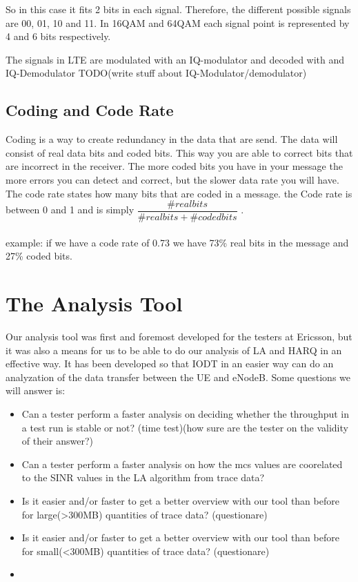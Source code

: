 \documentclass[cropmarks, frame, english]{idamasterthesis}
\begin{document}
 So in this case it fits 2 bits in each signal. Therefore, the different possible signals are 00, 01, 10 and 11. In 16QAM and 64QAM each signal point is represented by 4 and 6 bits respectively.

The signals in LTE are modulated with an IQ-modulator and decoded with and IQ-Demodulator 
TODO(write stuff about IQ-Modulator/demodulator)

\section{Coding and Code Rate}
Coding is a way to create redundancy in the data that are send. The data will consist of real data bits and coded bits. This way you are able to correct bits that are incorrect in the receiver. The more coded bits you have in your message the more errors you can detect and correct, but the slower data rate you will have. The code rate states how many bits that are coded in a message. the Code rate is between 0 and 1 and is simply $\dfrac{\# real bits}{ \# real bits + \# coded bits}$ . 
\\ \\
example: if we have a code rate of 0.73 we have 73\% real bits in the message and 27\% coded bits. 



\chapter{The Analysis Tool}
Our analysis tool was first and foremost developed for the testers at Ericsson, but it was also a means for us to be able to do our analysis of LA and HARQ in an effective way. It has been developed so that IODT in an easier way can do an analyzation of the data transfer between the UE and eNodeB. Some questions we will answer is:
\begin{itemize}
	\item Can a tester perform a faster analysis on deciding whether the throughput in a test run is stable or not? (time test)(how sure are the tester on the validity of their answer?)
	\item Can a tester perform a faster analysis on how the mcs values are coorelated to the SINR values in the LA algorithm from trace data?
	\item Is it easier and/or faster to get a better overview with our tool than before for large(>300MB) quantities of trace data? (questionare)
	\item Is it easier and/or faster to get a better overview with our tool than before for small(<300MB) quantities of trace data? (questionare)
	\item 
\end{itemize} 
\end{document}
